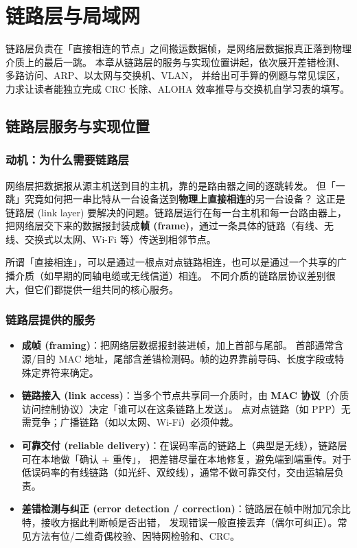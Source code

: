\clearpage
\begingroup
\let\clearpage\relax
\let\cleardoublepage\relax
\vspace*{\fill}
\chapter{链路层与局域网}
\begin{center}
链路层负责在「直接相连的节点」之间搬运数据帧，是网络层数据报真正落到物理介质上的最后一跳。
本章从链路层的服务与实现位置讲起，依次展开差错检测、多路访问、ARP、以太网与交换机、VLAN，
并给出可手算的例题与常见误区，力求让读者能独立完成 CRC 长除、ALOHA 效率推导与交换机自学习表的填写。
\end{center}
\vspace*{\fill}
\endgroup
\clearpage

\section{链路层服务与实现位置}

\subsection{动机：为什么需要链路层}

网络层把数据报从源主机送到目的主机，靠的是路由器之间的逐跳转发。
但「一跳」究竟如何把一串比特从一台设备送到\textbf{物理上直接相连}的另一台设备？
这正是链路层 (link layer) 要解决的问题。链路层运行在每一台主机和每一台路由器上，
把网络层交下来的数据报封装成\textbf{帧 (frame)}，通过一条具体的链路（有线、无线、交换式以太网、Wi-Fi 等）传送到相邻节点。

所谓「直接相连」，可以是通过一根点对点链路相连，也可以是通过一个共享的广播介质（如早期的同轴电缆或无线信道）相连。
不同介质的链路层协议差别很大，但它们都提供一组共同的核心服务。

\subsection{链路层提供的服务}

\begin{itemize}
    \item \textbf{成帧 (framing)}：把网络层数据报封装进帧，加上首部与尾部。
        首部通常含源/目的 MAC 地址，尾部含差错检测码。帧的边界靠前导码、长度字段或特殊定界符来确定。
    \item \textbf{链路接入 (link access)}：当多个节点共享同一介质时，由 \textbf{MAC 协议}（介质访问控制协议）决定「谁可以在这条链路上发送」。
        点对点链路（如 PPP）无需竞争；广播链路（如以太网、Wi-Fi）必须仲裁。
    \item \textbf{可靠交付 (reliable delivery)}：在误码率高的链路上（典型是无线），链路层可在本地做「确认 + 重传」，
        把差错尽量在本地修复，避免端到端重传。对于低误码率的有线链路（如光纤、双绞线），通常不做可靠交付，交由运输层负责。
    \item \textbf{差错检测与纠正 (error detection / correction)}：链路层在帧中附加冗余比特，接收方据此判断帧是否出错，
        发现错误一般直接丢弃（偶尔可纠正）。常见方法有位/二维奇偶校验、因特网检验和、CRC。
\end{itemize}


